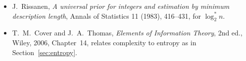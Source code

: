 \begin{itemize}
\item J.~Rissanen, \emph{A universal prior for integers and estimation by minimum description length}, Annals of Statistics 11 (1983), 416--431, for $\log_2^*n$.
\item T.~M.~Cover and J.~A.~Thomas, \emph{Elements of Information Theory}, 2nd ed., Wiley, 2006, Chapter~14, relates complexity to entropy as in Section~\ref{sec:entropy}.
\end{itemize}
